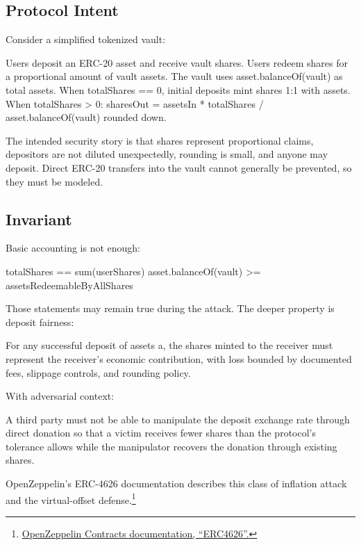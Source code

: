 \subsection{Protocol Intent}

Consider a simplified tokenized vault:

\begin{codeblock}
Users deposit an ERC-20 asset and receive vault shares.
Users redeem shares for a proportional amount of vault assets.
The vault uses asset.balanceOf(vault) as total assets.
When totalShares == 0, initial deposits mint shares 1:1 with assets.
When totalShares > 0:
    sharesOut = assetsIn * totalShares / asset.balanceOf(vault)
rounded down.
\end{codeblock}

The intended security story is that shares represent proportional claims, depositors are not diluted unexpectedly, rounding is small, and anyone may deposit. Direct ERC-20 transfers into the vault cannot generally be prevented, so they must be modeled.

\subsection{Invariant}

Basic accounting is not enough:

\begin{codeblock}
totalShares == sum(userShares)
asset.balanceOf(vault) >= assetsRedeemableByAllShares
\end{codeblock}

Those statements may remain true during the attack. The deeper property is deposit fairness:

\begin{codeblock}
For any successful deposit of assets a,
the shares minted to the receiver must represent the receiver's
economic contribution, with loss bounded by documented fees,
slippage controls, and rounding policy.
\end{codeblock}

With adversarial context:

\begin{codeblock}
A third party must not be able to manipulate the deposit exchange rate
through direct donation so that a victim receives fewer shares than
the protocol's tolerance allows while the manipulator recovers the
donation through existing shares.
\end{codeblock}

OpenZeppelin's ERC-4626 documentation describes this class of inflation attack and the virtual-offset defense.\footnote{\href{https://docs.openzeppelin.com/contracts/5.x/erc4626}{OpenZeppelin Contracts documentation, ``ERC4626''.}}

